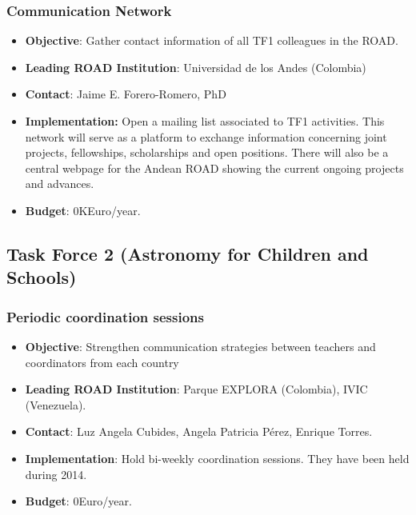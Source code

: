 \documentclass[12pt]{article}
\begin{document}
\subsubsection{Communication Network}
\begin{itemize}
  \item{\bf Objective}: Gather contact information of all TF1 colleagues in
    the ROAD.
  \item{\bf Leading ROAD Institution}: Universidad de los Andes (Colombia)
  \item{\bf Contact}: Jaime E. Forero-Romero, PhD
  \item{\bf Implementation:} Open a mailing list associated to TF1
    activities. This network will serve as a platform to exchange
    information concerning joint projects, fellowships, scholarships
    and open positions. There will also be a central webpage for the
    Andean ROAD showing the current ongoing projects and advances.
  \item{\bf Budget}: 0KEuro/year.
\end{itemize}


\subsection{Task Force 2 (Astronomy for Children and Schools)}


\subsubsection{Periodic coordination sessions}

\begin{itemize}

\item{\bf Objective}: Strengthen communication  strategies between
  teachers  and coordinators from each  country
\item{\bf Leading ROAD Institution}: Parque EXPLORA (Colombia), IVIC
  (Venezuela). 
\item{\bf Contact}: Luz Angela Cubides,  Angela Patricia  P\'erez,
  Enrique  Torres.
\item{\bf Implementation}: Hold bi-weekly coordination sessions. They
  have been held during 2014.
\item{\bf Budget}: 0Euro/year.
\end{itemize}
\end{document}
